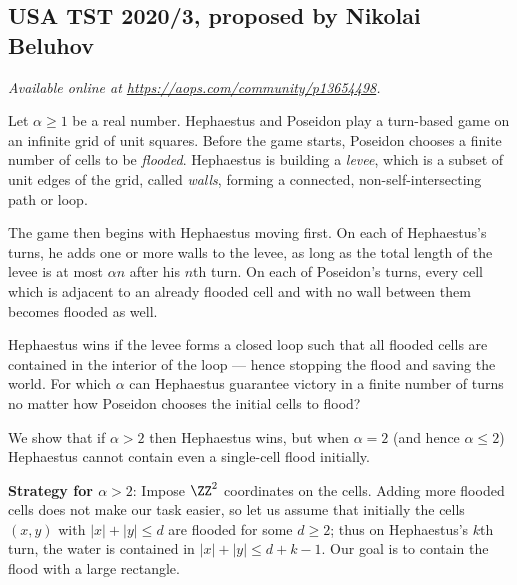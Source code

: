 \documentclass[11pt]{scrartcl}
\begin{document}
\subsection{USA TST 2020/3, proposed by Nikolai Beluhov}
\textsl{Available online at \url{https://aops.com/community/p13654498}.}
\begin{mdframed}[style=mdpurplebox,frametitle={Problem statement}]
Let $\alpha \ge 1$ be a real number.
Hephaestus and Poseidon play a turn-based game
on an infinite grid of unit squares.
Before the game starts, Poseidon chooses a finite
number of cells to be \emph{flooded}.
Hephaestus is building a \emph{levee},
which is a subset of unit edges of the grid, called \emph{walls},
forming a connected, non-self-intersecting path or loop.

The game then begins with Hephaestus moving first.
On each of Hephaestus's turns, he adds one or more walls
to the levee, as long as the total length of the levee
is at most $\alpha n$ after his $n$th turn.
On each of Poseidon's turns,
every cell which is adjacent to an already flooded cell
and with no wall between them becomes flooded as well.

Hephaestus wins if the levee forms a closed loop
such that all flooded cells are
contained in the interior of the loop ---
hence stopping the flood and saving the world.
For which $\alpha$ can Hephaestus guarantee victory
in a finite number of turns
no matter how Poseidon chooses the initial cells to flood?
\end{mdframed}
We show that if $\alpha > 2$
then Hephaestus wins,
but when $\alpha = 2$ (and hence $\alpha \le 2$)
Hephaestus cannot contain even a single-cell flood initially.

\bigskip

\textbf{Strategy for $\alpha > 2$}:
Impose $\ZZ^2$ coordinates on the cells.
Adding more flooded cells does not make our task easier,
so let us assume that initially
the cells $(x,y)$ with $|x|+|y| \le d$ are flooded
for some $d \ge 2$;
thus on Hephaestus's $k$th turn,
the water is contained in $|x|+|y| \le d+k-1$.
Our goal is to contain the flood with a large rectangle.
\end{document}
